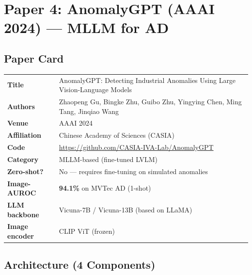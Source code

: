 \documentclass[12pt, a4paper]{article}
\begin{document}

\section{Paper 4: AnomalyGPT (AAAI 2024) --- MLLM for AD}

\subsection{Paper Card}
\begin{tabularx}{\textwidth}{@{}lX@{}}
\toprule
\textbf{Title} & AnomalyGPT: Detecting Industrial Anomalies Using Large Vision-Language Models \\
\textbf{Authors} & Zhaopeng Gu, Bingke Zhu, Guibo Zhu, Yingying Chen, Ming Tang, Jinqiao Wang \\
\textbf{Venue} & AAAI 2024 \\
\textbf{Affiliation} & Chinese Academy of Sciences (CASIA) \\
\textbf{Code} & \url{https://github.com/CASIA-IVA-Lab/AnomalyGPT} \\
\textbf{Category} & MLLM-based (fine-tuned LVLM) \\
\textbf{Zero-shot?} & No --- requires fine-tuning on simulated anomalies \\
\textbf{Image-AUROC} & \textbf{94.1\%} on MVTec AD (1-shot) \\
\textbf{LLM backbone} & Vicuna-7B / Vicuna-13B (based on LLaMA) \\
\textbf{Image encoder} & CLIP ViT (frozen) \\
\bottomrule
\end{tabularx}

\subsection{Architecture (4 Components)}
\end{document}
